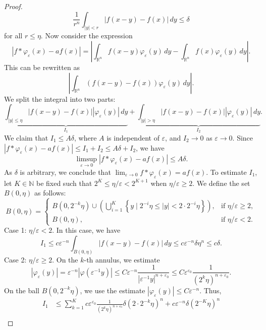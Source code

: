 \begin{proof}
$$\frac{1}{r^n} \int_{|y| < r} |f(x-y) - f(x)| \, dy \leq \delta$$
for all $r \leq \eta$. Now consider the expression
$$\left|f * \varphi_{\varepsilon}(x) - a f(x)\right| = \left|\int_{\mathbb{R}^n} f(x-y) \varphi_{\varepsilon}(y) \, dy - \int_{\mathbb{R}^n} f(x) \varphi_{\varepsilon}(y) \, dy\right|.$$
This can be rewritten as
$$\left|\int_{\mathbb{R}^n} (f(x-y) - f(x)) \varphi_{\varepsilon}(y) \, dy\right|.$$
We split the integral into two parts:
$$\underbrace{\int_{|y| \leq \eta} |f(x-y) - f(x)| |\varphi_{\varepsilon}(y)| \, dy}_{I_1} + \underbrace{\int_{|y| > \eta} |f(x-y) - f(x)| |\varphi_{\varepsilon}(y)| \, dy}_{I_2}.$$
We claim that $I_1 \leq A \delta$, where $A$ is independent of $\varepsilon$, and $I_2 \rightarrow 0$ as $\varepsilon \rightarrow 0$. Since $\left|f * \varphi_{\varepsilon}(x)-a f(x)\right| \leqslant I_1+I_2 \leqslant A \delta+I_2$, we have
$$
\limsup _{\varepsilon \rightarrow 0}\left|f * \varphi_{\varepsilon}(x)-a f(x)\right| \leq A \delta.
$$
As $\delta$ is arbitrary, we conclude that $\lim _{\varepsilon \rightarrow 0} f * \varphi_{\varepsilon}(x)=a f(x)$.
To estimate $I_1$, let $K \in \mathbb{N}$ be fixed such that $2^K \leqslant \eta / \varepsilon < 2^{K+1}$ when $\eta / \varepsilon \geqslant 2$. We define the set $B(0, \eta)$ as follows:
$$
B(0, \eta) = 
\begin{cases}
B(0, 2^{-k} \eta) \cup \left(\bigcup_{i=1}^K \left\{ y \mid 2^{-i} \eta \leq |y| < 2 \cdot 2^{-i} \eta \right\}\right), & \text{if } \eta / \varepsilon \geqslant 2, \\
B(0, \eta), & \text{if } \eta / \varepsilon < 2.
\end{cases}
$$
Case 1: $\eta / \varepsilon < 2$. In this case, we have
$$
I_1 \leqslant c \varepsilon^{-n} \int_{B(0, \eta)}|f(x-y)-f(x)| \, dy \leqslant c \varepsilon^{-n} \delta \eta^n \leqslant c \delta.
$$
Case 2: $\eta / \varepsilon \geqslant 2$. On the $k$-th annulus, we estimate
$$
\left|\varphi_{\varepsilon}(y)\right| = \varepsilon^{-n}\left|\varphi\left(\varepsilon^{-1} y\right)\right| \leqslant C \varepsilon^{-n} \frac{1}{\left|\varepsilon^{-1} y\right|^{n+\varepsilon_0}} \leqslant C \varepsilon^{\varepsilon_0} \frac{1}{\left(2^k \eta\right)^{n+\varepsilon_0}}.
$$
On the ball $B\left(0, 2^{-k} \eta\right)$, we use the estimate $\left|\varphi_{\varepsilon}(y)\right| \leqslant C \varepsilon^{-n}$.
Thus,
$$
\begin{aligned}
I_1 &\leqslant \sum_{k=1}^K c \varepsilon^{\varepsilon_0} \frac{1}{\left(2^k \eta\right)^{n+\varepsilon_0}} \delta \left(2 \cdot 2^{-k} \eta\right)^n + c \varepsilon^{-n} \delta \left(2^{-K} \eta\right)^n \\

\end{aligned}$$
\end{proof}
